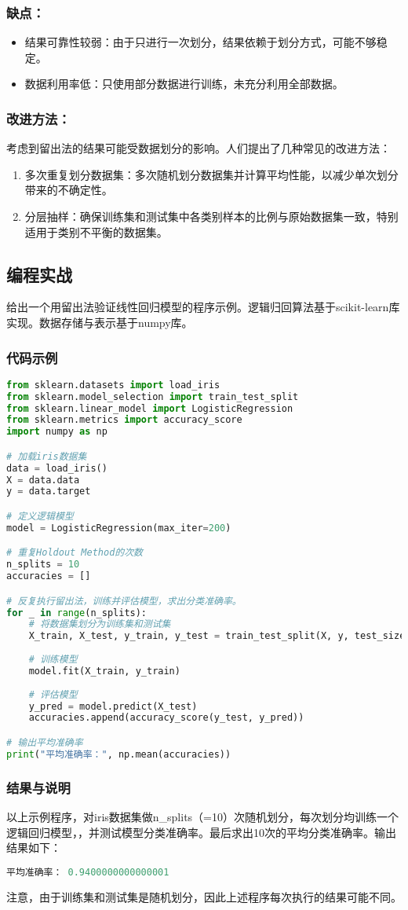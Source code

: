 \subsubsection{缺点：}
\begin{itemize}
\item 结果可靠性较弱：由于只进行一次划分，结果依赖于划分方式，可能不够稳定。
\item 数据利用率低：只使用部分数据进行训练，未充分利用全部数据。
\end{itemize}

\subsubsection{改进方法：}
考虑到留出法的结果可能受数据划分的影响。人们提出了几种常见的改进方法：

\begin{enumerate}
\item 多次重复划分数据集：多次随机划分数据集并计算平均性能，以减少单次划分带来的不确定性。
\item 分层抽样：确保训练集和测试集中各类别样本的比例与原始数据集一致，特别适用于类别不平衡的数据集。
\end{enumerate}

\subsection{编程实战}
给出一个用留出法验证线性回归模型的程序示例。逻辑归回算法基于scikit-learn库实现。数据存储与表示基于numpy库。
\subsubsection{代码示例}
\begin{lstlisting}[language=python]
from sklearn.datasets import load_iris
from sklearn.model_selection import train_test_split
from sklearn.linear_model import LogisticRegression
from sklearn.metrics import accuracy_score
import numpy as np

# 加载iris数据集
data = load_iris()
X = data.data
y = data.target

# 定义逻辑模型
model = LogisticRegression(max_iter=200)

# 重复Holdout Method的次数
n_splits = 10
accuracies = []

# 反复执行留出法，训练并评估模型，求出分类准确率。
for _ in range(n_splits):
    # 将数据集划分为训练集和测试集
    X_train, X_test, y_train, y_test = train_test_split(X, y, test_size=0.2)
    
    # 训练模型
    model.fit(X_train, y_train)
    
    # 评估模型
    y_pred = model.predict(X_test)
    accuracies.append(accuracy_score(y_test, y_pred))

# 输出平均准确率
print("平均准确率：", np.mean(accuracies))
\end{lstlisting}

\subsubsection{结果与说明}
以上示例程序，对iris数据集做n_splits（=10）次随机划分，每次划分均训练一个逻辑回归模型，，并测试模型分类准确率。最后求出10次的平均分类准确率。输出结果如下：
\begin{lstlisting}[language=python]
平均准确率： 0.9400000000000001
\end{lstlisting}

注意，由于训练集和测试集是随机划分，因此上述程序每次执行的结果可能不同。